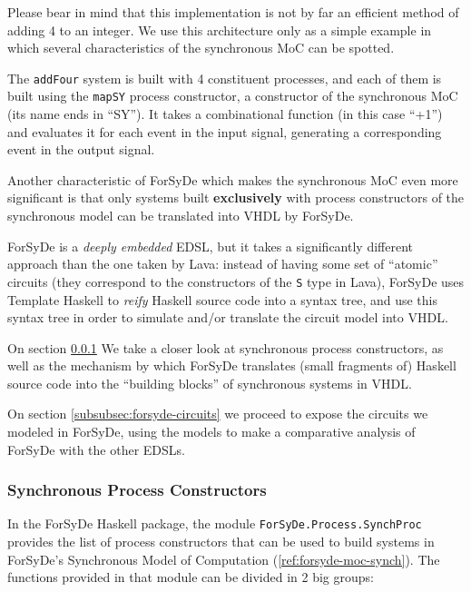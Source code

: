             Please bear in mind that this implementation is not by far an efficient method of adding
            4 to an integer. We use this architecture only as a simple example in which several
            characteristics of the synchronous \ac{MoC} can be spotted.

            The \texttt{addFour} system is built with 4 constituent processes, and each of them is
            built using the \texttt{mapSY} process constructor, a constructor of the synchronous
            \ac{MoC} (its name ends in ``SY''). It takes a combinational function (in this case
            ``+1'') and evaluates it for each event in the input signal, generating a corresponding
            event in the output signal.

            Another characteristic of ForSyDe which makes the synchronous \ac{MoC} even more
            significant is that only systems built \textbf{exclusively} with process constructors of
            the synchronous model can be translated into VHDL by ForSyDe.

            ForSyDe is a \emph{deeply embedded} \ac{EDSL}, but it takes a significantly different
            approach than the one taken by Lava: instead of having some set of ``atomic'' circuits
            (they correspond to the constructors of the \texttt{S} type in Lava), ForSyDe uses
            Template Haskell to \emph{reify} Haskell source code into a syntax tree, and use this
            syntax tree in order to simulate and/or translate the circuit model into VHDL.

            On section \ref{subsubsec:forsyde-synchprocs} We take a closer look at synchronous
            process constructors, as well as the mechanism by which ForSyDe translates (small
            fragments of) Haskell source code into the ``building blocks'' of synchronous systems in
            VHDL.

            On section \ref{subsubsec:forsyde-circuits} we proceed to expose the circuits we modeled
            in ForSyDe, using the models to make a comparative analysis of ForSyDe with the other
            \acp{EDSL}.

        \subsubsection{Synchronous Process Constructors}
        \label{subsubsec:forsyde-synchprocs}
            In the ForSyDe Haskell package, the module \texttt{ForSyDe.Process.SynchProc} provides
            the list of process constructors that can be used to build systems in ForSyDe's
            Synchronous Model of Computation (\ref{ref:forsyde-moc-synch}). The functions provided
            in that module can be divided in 2 big groups:

